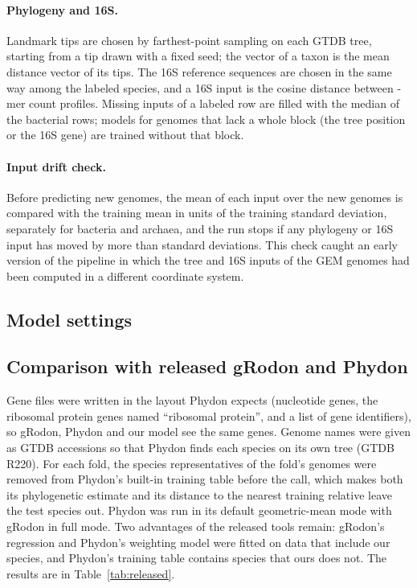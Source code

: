 

\paragraph{Phylogeny and 16S.} Landmark tips are chosen by farthest-point sampling on each GTDB tree, starting from a tip
drawn with a fixed seed; the vector of a taxon is the mean distance vector of its tips. The 16S reference sequences are
chosen in the same way among the labeled species, and a 16S input is the cosine distance between \KmerK-mer count
profiles. Missing inputs of a labeled row are filled with the median of the bacterial rows; models for genomes that lack a
whole block (the tree position or the 16S gene) are trained without that block.

\paragraph{Input drift check.} Before predicting new genomes, the mean of each input over the new genomes is compared with
the training mean in units of the training standard deviation, separately for bacteria and archaea, and the run stops if
any phylogeny or 16S input has moved by more than \DriftSD standard deviations. This check caught an early version of the
pipeline in which the tree and 16S inputs of the GEM genomes had been computed in a different coordinate system.

\subsection{Model settings}


\subsection{Comparison with released gRodon and Phydon}
Gene files were written in the layout Phydon expects (nucleotide genes, the ribosomal protein genes named ``ribosomal
protein'', and a list of gene identifiers), so gRodon, Phydon and our model see the same genes. Genome names were given as
GTDB accessions so that Phydon finds each species on its own tree (GTDB R220). For each fold, the species representatives
of the fold's genomes were removed from Phydon's built-in training table before the call, which makes both its
phylogenetic estimate and its distance to the nearest training relative leave the test species out. Phydon was run in its
default geometric-mean mode with gRodon in full mode. Two advantages of the released tools remain: gRodon's regression and
Phydon's weighting model were fitted on data that include our species, and Phydon's training table contains species that
ours does not. The results are in Table~\ref{tab:released}.

